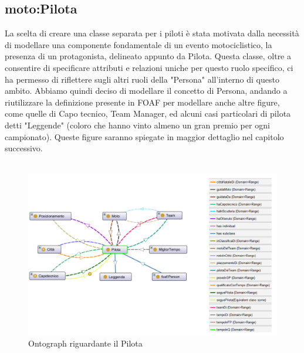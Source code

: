 \newpage

\subsection{moto:Pilota}
 La scelta di creare una classe separata per i piloti è stata motivata dalla necessità di modellare una componente fondamentale di un evento motociclistico, la presenza di un protagonista, delineato appunto da Pilota. Questa classe, oltre a consentire di specificare attributi e relazioni uniche per questo ruolo specifico, ci ha permesso di riflettere sugli altri ruoli della "Persona" all'interno di questo ambito. Abbiamo quindi deciso di modellare il concetto di Persona, andando a riutilizzare la definizione presente in FOAF per modellare anche altre figure, come quelle di Capo tecnico, Team Manager, ed alcuni casi particolari di pilota detti "Leggende" (coloro che hanno vinto almeno un gran premio per ogni campionato). Queste figure saranno spiegate in maggior dettaglio nel capitolo successivo.
\\\\
\begin{figure}[H]
    \begin{center}
        \includegraphics[scale=0.75]{img/pilota.png}
       \caption{Ontograph riguardante il Pilota} 
    \end{center}
\end{figure}

\newpage

